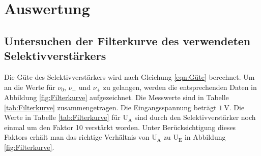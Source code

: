 \section{Auswertung}
\label{sec:Auswertung}

\subsection{Untersuchen der Filterkurve des verwendeten Selektivverstärkers}

Die Güte des Selektivverstärkers wird nach Gleichung \eqref{eqn:Güte} berechnet.
Um an die Werte für $\nu_0$, $\nu_-$ und $\nu_+$ zu gelangen, werden die entsprechenden Daten in Abbildung \ref{fig:Filterkurve} aufgezeichnet.
Die Messwerte sind in Tabelle \ref{tab:Filterkurve} zusammengetragen.
Die Eingangsspannung beträgt $\SI{1}{\volt}$.
Die Werte in Tabelle \ref{tab:Filterkurve} für $\text{U}_\text{A}$ sind durch den Selektivverstärker noch einmal um den Faktor 10 verstärkt worden.
Unter Berücksichtigung dieses Faktors erhält man das richtige Verhältnis  von $\text{U}_\text{A}$ zu $\text{U}_\text{E}$ in Abbildung \ref{fig:Filterkurve}.

